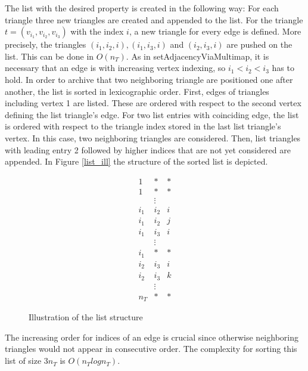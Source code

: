 \documentclass[10pt]{article}
\begin{document}
The list with the desired property is created in the following way: For each triangle three new triangles are created and appended to the list. For the triangle $t = (v_{i_1},v_{i_2},v_{i_3})$ with the index $i$, a new triangle for every edge is defined. More precisely, the triangles $({i_1},{i_2},i), ({i_1},{i_3},i)$ and $({i_2},{i_3},i)$ are pushed on the list. This can be done in $O(n_T)$. As in {\ttfamily setAdjacencyViaMultimap}, it is necessary that an edge is with increasing vertex indexing, so $i_1 < i_2 < i_3$ has to hold. In order to archive that two neighboring triangle are positioned one after another, the list is sorted in lexicographic order. First, edges of triangles including vertex 1 are listed. These are ordered with respect to the second vertex defining the list triangle's edge. For two list entries with coinciding edge, the list is ordered with respect to the triangle index stored in the last list triangle's vertex. In this case, two neighboring triangles are considered. Then, list triangles with leading entry 2 followed by higher indices that are not yet considered are appended. In Figure \ref{list_ill} the structure of the sorted list is depicted.

\begin{equation*}
\begin{matrix}
1 & * & * \\
1 & * & * \\
& \vdots & \\
i_1 & i_2 & i \\
i_1 & i_2 & j \\
i_1 & i_3 & i \\
& \vdots & \\
i_1 & * & * \\
i_2 & i_3 & i \\
i_2 & i_3 & k \\
& \vdots & \\
n_T & * & * 
\end{matrix}
\end{equation*}
\begin{figure}[h]
	\caption{Illustration of the list structure}
\end{figure}
\label{list_ill}

The increasing order for indices of an edge is crucial since otherwise neighboring triangles would not appear in consecutive order. The complexity for sorting this list of size $ 3 n_T$ is $O(n_Tlogn_T)$.
\end{document}

